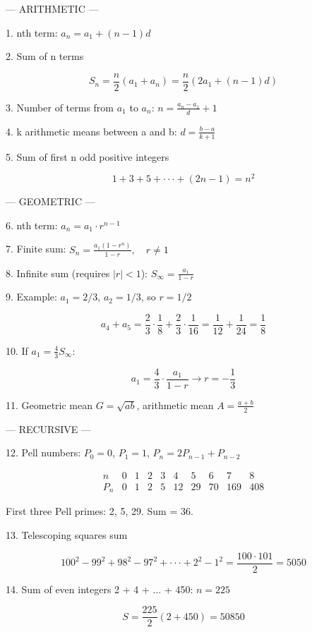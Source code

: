 --- ARITHMETIC ---

1. nth term: $a_n = a_1 + (n-1)d$

2. Sum of n terms

$$ S_n = \frac{n}{2}(a_1 + a_n) = \frac{n}{2}\left(2a_1 + (n-1)d\right) $$

3. Number of terms from $a_1$ to $a_n$: $n = \frac{a_n - a_1}{d} + 1$

4. k arithmetic means between a and b: $d = \frac{b-a}{k+1}$

5. Sum of first n odd positive integers

$$ 1 + 3 + 5 + \cdot\cdot\cdot + (2n-1) = n^2 $$

--- GEOMETRIC ---

6. nth term: $a_n = a_1 \cdot r^{n-1}$

7. Finite sum: $S_n = \frac{a_1(1-r^n)}{1-r}, \quad r \ne 1$

8. Infinite sum (requires $|r| < 1$): $S_\infty = \frac{a_1}{1-r}$

9. Example: $a_1 = 2/3$, $a_2 = 1/3$, so $r = 1/2$

$$ a_4 + a_5 = \frac{2}{3} \cdot \frac{1}{8} + \frac{2}{3} \cdot \frac{1}{16} = \frac{1}{12} + \frac{1}{24} = \frac{1}{8} $$

10. If $a_1 = \frac{4}{3} S_\infty$:

$$ a_1 = \frac{4}{3} \cdot \frac{a_1}{1-r} \rightarrow r = -\frac{1}{3} $$

11. Geometric mean $G = \sqrt{ab}$, arithmetic mean $A = \frac{a+b}{2}$

--- RECURSIVE ---

12. Pell numbers: $P_0=0$, $P_1=1$, $P_n = 2P_{n-1} + P_{n-2}$

$$ \begin{array}{c|ccccccccc}
n & 0 & 1 & 2 & 3 & 4 & 5 & 6 & 7 & 8 \\
P_n & 0 & 1 & 2 & 5 & 12 & 29 & 70 & 169 & 408
\end{array} $$

First three Pell primes: 2, 5, 29. Sum = 36.

13. Telescoping squares sum

$$ 100^2 - 99^2 + 98^2 - 97^2 + \cdot\cdot\cdot + 2^2 - 1^2 = \frac{100 \cdot 101}{2} = 5050 $$

14. Sum of even integers 2 + 4 + ... + 450: $n = 225$

$$ S = \frac{225}{2}(2 + 450) = 50850 $$
